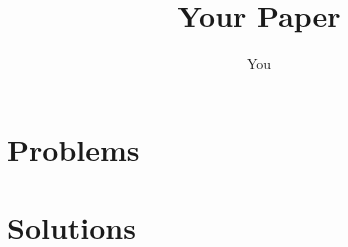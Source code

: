 \documentclass[12pt]{book}
\title{Your Paper}
\author{You}
\newcounter{sudokucounter}
\begin{document}
\maketitle

\section*{Problems}


\section*{Solutions}
\setcounter{sudokucounter}{0}

\end{document}
